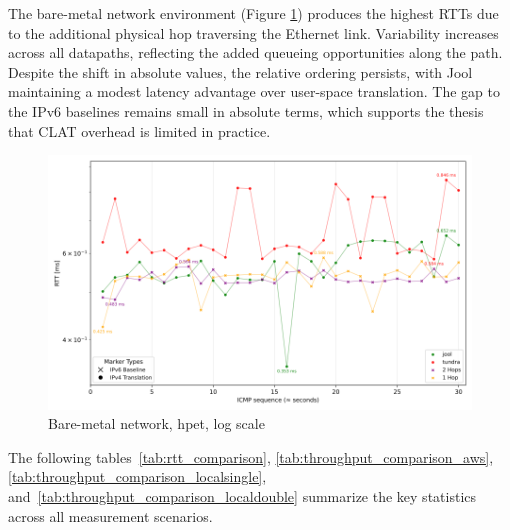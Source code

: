 The bare-metal network environment (Figure \ref{fig:Dual_icmp_sameScale_hpet_log}) produces the highest RTTs due to the additional physical hop traversing the Ethernet link. Variability increases across all datapaths, reflecting the added queueing opportunities along the path. Despite the shift in absolute values, the relative ordering persists, with Jool maintaining a modest latency advantage over user-space translation. The gap to the IPv6 baselines remains small in absolute terms, which supports the thesis that CLAT overhead is limited in practice.


\begin{figure}[H]
    \centering
    \includegraphics[width=1\textwidth]{resources/plots/CombinedPlot/RTT/Double_ping_rtt_Ping_30s_log.png}
    \caption{Bare-metal network, hpet, log scale}
    \label{fig:Dual_icmp_sameScale_hpet_log}
\end{figure}

The following tables~\ref{tab:rtt_comparison}, \ref{tab:throughput_comparison_aws}, \ref{tab:throughput_comparison_localsingle}, and~\ref{tab:throughput_comparison_localdouble} summarize the key statistics across all measurement scenarios.

